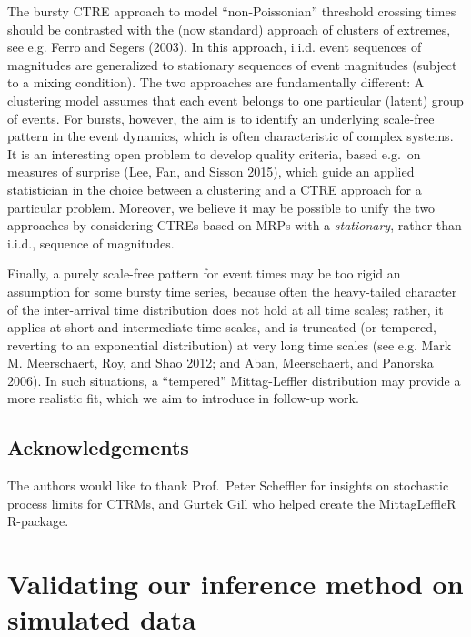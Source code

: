 \documentclass[smallextended]{svjour3}       %
\begin{document}
The bursty CTRE approach to model ``non-Poissonian'' threshold crossing
times should be contrasted with the (now standard) approach of clusters
of extremes, see e.g. Ferro and Segers (2003). In this approach, i.i.d.
event sequences of magnitudes are generalized to stationary sequences of
event magnitudes (subject to a mixing condition). The two approaches are
fundamentally different: A clustering model assumes that each event
belongs to one particular (latent) group of events. For bursts, however,
the aim is to identify an underlying scale-free pattern in the event
dynamics, which is often characteristic of complex systems. It is an
interesting open problem to develop quality criteria, based e.g.~on
measures of surprise (Lee, Fan, and Sisson 2015), which guide an applied
statistician in the choice between a clustering and a CTRE approach for
a particular problem. Moreover, we believe it may be possible to unify
the two approaches by considering CTREs based on MRPs with a
\emph{stationary}, rather than i.i.d., sequence of magnitudes.

Finally, a purely scale-free pattern for event times may be too rigid an
assumption for some bursty time series, because often the heavy-tailed
character of the inter-arrival time distribution does not hold at all
time scales; rather, it applies at short and intermediate time scales,
and is truncated (or tempered, reverting to an exponential distribution)
at very long time scales (see e.g. Mark M. Meerschaert, Roy, and Shao
2012; and Aban, Meerschaert, and Panorska 2006). In such situations, a
``tempered'' Mittag-Leffler distribution may provide a more realistic
fit, which we aim to introduce in follow-up work.

\subsection*{Acknowledgements}\label{acknowledgements}

The authors would like to thank Prof.~Peter Scheffler for insights on
stochastic process limits for CTRMs, and Gurtek Gill who helped create
the MittagLeffleR R-package.

\appendix

\section{Validating our inference method on simulated
data}\label{validating-our-inference-method-on-simulated-data}
\end{document}

